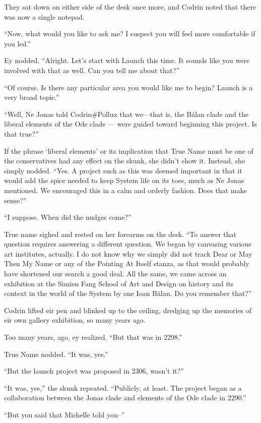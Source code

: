 They sat down on either side of the desk once more, and Codrin noted that there was now a single notepad.

``Now, what would you like to ask me? I suspect you will feel more comfortable if you led.''

Ey nodded. ``Alright. Let's start with Launch this time. It sounds like you were involved with that as well. Can you tell me about that?''

``Of course. Is there any particular area you would like me to begin? Launch is a very broad topic.''

``Well, Ne Jonas told Codrin\#Pollux that we---that is, the Bălan clade and the liberal elements of the Ode clade — were guided toward beginning this project. Is that true?''

If the phrase `liberal elements' or its implication that True Name must be one of the conservatives had any effect on the skunk, she didn't show it. Instead, she simply nodded. ``Yes. A project such as this was deemed important in that it would add the spice needed to keep System life on its toes, much as Ne Jonas mentioned. We encouraged this in a calm and orderly fashion. Does that make sense?''

``I suppose. When did the nudges come?''

True name sighed and rested on her forearms on the desk. ``To answer that question requires answering a different question. We began by canvasing various art institutes, actually. I do not know why we simply did not track Dear or May Then My Name or any of the Pointing At Itself stanza, as that would probably have shortened our search a good deal. All the same, we came across an exhibition at the Simien Fang School of Art and Design on history and its context in the world of the System by one Ioan Bălan. Do you remember that?''

Codrin lifted eir pen and blinked up to the ceiling, dredging up the memories of eir own gallery exhibition, so many years ago.

Too many years, ago, ey realized. ``But that was in 2298.''

True Name nodded. ``It was, yes.''

``But the launch project was proposed in 2306, wasn't it?''

``It was, yes,'' the skunk repeated. ``Publicly, at least. The project began as a collaboration between the Jonas clade and elements of the Ode clade in 2290.''

``But you said that Michelle told you--''


